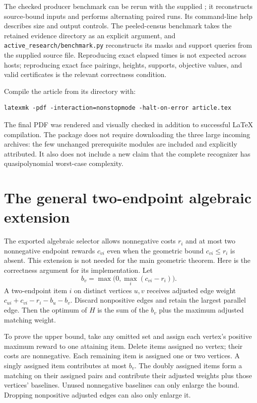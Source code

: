 The checked producer benchmark can be rerun with the supplied
; it reconstructs
source-bound inputs and performs alternating paired runs. Its command-line
help describes size and output controls. The peeled-census benchmark takes
the retained evidence directory as an explicit argument, and
\texttt{active\_research/benchmark.py} reconstructs its masks and support
queries from the supplied source file. Reproducing exact elapsed times is
not expected across hosts; reproducing exact face pairings, heights,
supports, objective values, and valid certificates is the relevant
correctness condition.

Compile the article from its directory with:
\begin{lstlisting}
latexmk -pdf -interaction=nonstopmode -halt-on-error article.tex
\end{lstlisting}
The final PDF was rendered and visually checked in addition to successful
\LaTeX{} compilation. The package does not require downloading the three
large incoming archives: the few unchanged prerequisite modules are
included and explicitly attributed. It also does not include a new claim
that the complete recognizer has quasipolynomial worst-case complexity.

\section{The general two-endpoint algebraic extension}
\label{sec:general-reward-extension}

The exported algebraic selector allows nonnegative costs $r_i$ and at most
two nonnegative endpoint rewards $c_{vi}$ even when the geometric bound
$c_{vi}\le r_i$ is absent. This extension is not needed for the main
geometric theorem. Here is the correctness argument for its implementation.
Let
\[
 b_v=\max\bigl(0,\max_i(c_{vi}-r_i)\bigr).
\]
A two-endpoint item $i$ on distinct vertices $u,v$ receives adjusted edge
weight $c_{ui}+c_{vi}-r_i-b_u-b_v$. Discard nonpositive edges and retain the
largest parallel edge. Then the optimum of $H$ is the sum of the $b_v$
plus the maximum adjusted matching weight.

To prove the upper bound, take any omitted set and assign each vertex's
positive maximum reward to one attaining item. Delete items assigned no
vertex; their costs are nonnegative. Each remaining item is assigned one
or two vertices. A singly assigned item contributes at most $b_v$. The
doubly assigned items form a matching on their assigned pairs and
contribute their adjusted weights plus those vertices' baselines. Unused
nonnegative baselines can only enlarge the bound. Dropping nonpositive
adjusted edges can also only enlarge it.


